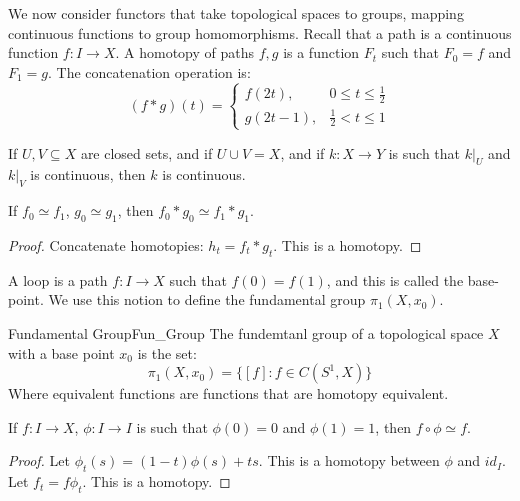    We now consider functors that take topological spaces to
    groups, mapping continuous functions to group homomorphisms.
    Recall that a path is a continuous function $f:I\rightarrow{X}$.
    A homotopy of paths $f,g$ is a function $F_{t}$ such that
    $F_{0}=f$ and $F_{1}=g$. The concatenation operation is:
    \begin{equation}
        (f*g)(t)=
        \begin{cases}
            f(2t),&0\leq{t}\leq\frac{1}{2}\\
            g(2t-1),&\frac{1}{2}<t\leq{1}
        \end{cases}
    \end{equation}
    \begin{theorem}
        If $U,V\subseteq{X}$ are closed sets, and if
        $U\cup{V}=X$, and if $k:X\rightarrow{Y}$ is such that
        $k|_{U}$ and $k|_{V}$ is continuous, then $k$ is continuous.
    \end{theorem}
    \begin{theorem}
        If $f_{0}\simeq{f}_{1}$, $g_{0}\simeq{g}_{1}$, then
        $f_{0}*g_{0}\simeq{f}_{1}*g_{1}$.
    \end{theorem}
    \begin{proof}
        Concatenate homotopies: $h_{t}=f_{t}*g_{t}$. This is a
        homotopy.
    \end{proof}
    A loop is a path $f:I\rightarrow{X}$ such that $f(0)=f(1)$, and
    this is called the base-point. We use this notion to define the
    fundamental group $\pi_{1}(X,x_{0})$.
    \begin{ldefinition}{Fundamental Group}{Fun_Group}
        The fundemtanl group of a topological space $X$ with a
        base point $x_{0}$ is the set:
        \begin{equation}
            \pi_{1}(X,x_{0})=\{[f]:f\in{C}(S^{1},X)\}
        \end{equation}
        Where equivalent functions are functions that are homotopy
        equivalent.
    \end{ldefinition}
    \begin{theorem}
        If $f:I\rightarrow{X}$, $\phi:I\rightarrow{I}$ is such that
        $\phi(0)=0$ and $\phi(1)=1$, then $f\circ\phi\simeq{f}$.
    \end{theorem}
    \begin{proof}
        Let $\phi_{t}(s)=(1-t)\phi(s)+ts$. This is a homotopy between
        $\phi$ and $id_{I}$. Let $f_{t}=f\phi_{t}$. This is a
        homotopy.
    \end{proof}
